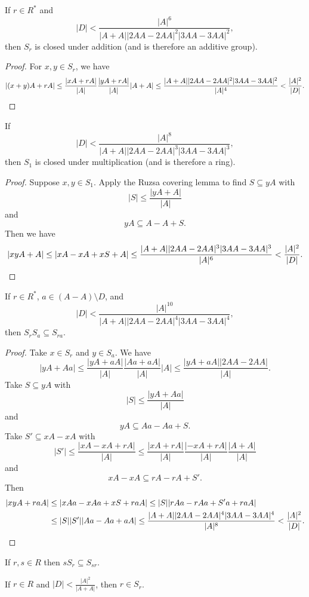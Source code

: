 \begin{prop} If $r \in R^*$ and
\[
|D| < \frac{|A|^6}{|A+A||2AA-2AA|^2|3AA-3AA|^2},
\]
then $S_r$ is closed under addition (and is therefore an additive group).
\end{prop}
\begin{proof} For $x,y \in S_r$, we have
\[
|(x+y)A + rA| \le \frac{|xA+rA|}{|A|}\frac{|yA+rA|}{|A|}|A+A| \le \frac{|A+A||2AA-2AA|^2|3AA-3AA|^2}{|A|^4} < \frac{|A|^2}{|D|}.\qedhere
\]
\end{proof}

\begin{prop} If
\[
|D| < \frac{|A|^8}{|A+A||2AA-2AA|^3|3AA-3AA|^3},
\]
then $S_1$ is closed under multiplication (and is therefore a ring).
\end{prop}
\begin{proof} Suppose $x,y \in S_1$. Apply the Ruzsa covering lemma to find $S \subseteq yA$ with
\[
|S| \le \frac{|yA+A|}{|A|}
\]
and
\[
yA \subseteq A-A+S.
\]
Then we have
\[
|xyA+A| \le |xA-xA+xS+A| \le \frac{|A+A||2AA-2AA|^3|3AA-3AA|^3}{|A|^6} < \frac{|A|^2}{|D|}.\qedhere
\]
\end{proof}

\begin{prop} If $r \in R^*$, $a \in (A-A)\setminus D$, and
\[
|D| < \frac{|A|^{10}}{|A+A||2AA-2AA|^4|3AA-3AA|^4},
\]
then $S_rS_a \subseteq S_{ra}$.
\end{prop}
\begin{proof} Take $x \in S_r$ and $y \in S_a$. We have
\[
|yA+Aa| \le \frac{|yA+aA|}{|A|}\frac{|Aa+aA|}{|A|}|A| \le \frac{|yA+aA||2AA-2AA|}{|A|}.
\]
Take $S \subseteq yA$ with
\[
|S| \le \frac{|yA+Aa|}{|A|}
\]
and
\[
yA \subseteq Aa-Aa+S.
\]
Take $S' \subseteq xA-xA$ with
\[
|S'| \le \frac{|xA-xA+rA|}{|A|} \le \frac{|xA+rA|}{|A|}\frac{|-xA+rA|}{|A|}\frac{|A+A|}{|A|}
\]
and
\[
xA-xA \subseteq rA-rA+S'.
\]
Then
\begin{align*}
|xyA+raA| &\le |xAa-xAa+xS+raA| \le |S||rAa-rAa+S'a+raA|\\
&\le |S||S'||Aa-Aa+aA| \le \frac{|A+A||2AA-2AA|^4|3AA-3AA|^4}{|A|^8} < \frac{|A|^2}{|D|}.\qedhere
\end{align*}
\end{proof}

\begin{prop} If $r,s \in R$ then $sS_r \subseteq S_{sr}$.
\end{prop}

\begin{prop} If $r \in R$ and  $|D| < \frac{|A|^2}{|A+A|}$, then $r \in S_r$.
\end{prop}

